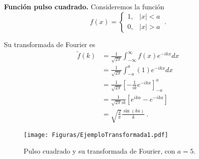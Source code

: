 \begin{ejemplo} \label{PulsoCuadrado}
    \textbf{Función pulso cuadrado.} Consideremos la función 
    \begin{equation*}
        f(x) = \left\{ \begin{array}{cl}
            1,& |x|<a  \\
            0,& |x|> a
        \end{array} \right. \ .
    \end{equation*}

    Su transformada de Fourier es 
    \begin{align}
        \tilde{f}(k) & = \frac{1}{\sqrt{2\pi}} \int_{-\infty}^{\infty} f(x) e^{-ikx} dx \nonumber \\
        & = \frac{1}{\sqrt{2\pi}}\int_{-a}^a (1)  e^{-ikx} dx \nonumber \\
        & = \frac{1}{\sqrt{2\pi}} \left[ - \frac{1}{ik} e^{-ikx} \right]_{-a}^a \nonumber\\
        & = \frac{1}{\sqrt{2\pi} i k} [e^{ika} - e^{-ika}] \nonumber\\
        & = \sqrt{\frac{2}{\pi}} \frac{\sin(ka)}{k} \ . \label{TransPulsoCuadrado}
    \end{align}

    \begin{figure}[H]
        \centering
        \texttt{[image: Figuras/EjemploTransformada1.pdf]}
        \caption{Pulso cuadrado y su transformada de Fourier, con $a = 5$.}
        \label{Espectro2}
    \end{figure}

\end{ejemplo}

